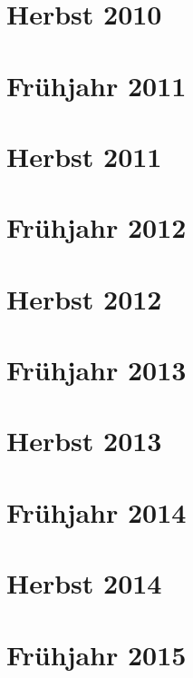 \documentclass{lehramt-informatik-examen-sammlung}
\begin{document}
\section{Herbst 2010}


\section{Frühjahr 2011}


\section{Herbst 2011}


\section{Frühjahr 2012}


\section{Herbst 2012}


\section{Frühjahr 2013}


\section{Herbst 2013}


\section{Frühjahr 2014}


\section{Herbst 2014}


\section{Frühjahr 2015}

\end{document}
